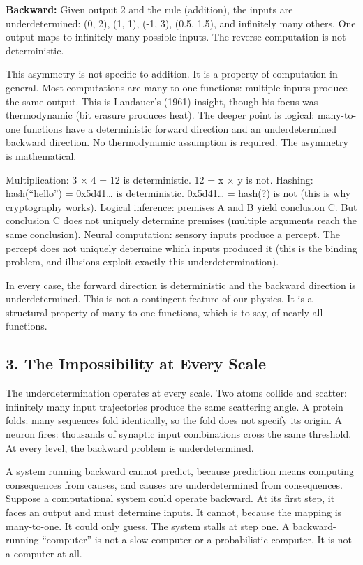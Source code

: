 \documentclass[
]{article}
\begin{document}
\textbf{Backward:} Given output 2 and the rule (addition), the inputs
are underdetermined: (0, 2), (1, 1), (-1, 3), (0.5, 1.5), and infinitely
many others. One output maps to infinitely many possible inputs. The
reverse computation is not deterministic.

This asymmetry is not specific to addition. It is a property of
computation in general. Most computations are many-to-one functions:
multiple inputs produce the same output. This is Landauer's (1961)
insight, though his focus was thermodynamic (bit erasure produces heat).
The deeper point is logical: many-to-one functions have a deterministic
forward direction and an underdetermined backward direction. No
thermodynamic assumption is required. The asymmetry is mathematical.

Multiplication: 3 × 4 = 12 is deterministic. 12 = x × y is not. Hashing:
hash(``hello'') = 0x5d41\ldots{} is deterministic. 0x5d41\ldots{} =
hash(?) is not (this is why cryptography works). Logical inference:
premises A and B yield conclusion C. But conclusion C does not uniquely
determine premises (multiple arguments reach the same conclusion).
Neural computation: sensory inputs produce a percept. The percept does
not uniquely determine which inputs produced it (this is the binding
problem, and illusions exploit exactly this underdetermination).

In every case, the forward direction is deterministic and the backward
direction is underdetermined. This is not a contingent feature of our
physics. It is a structural property of many-to-one functions, which is
to say, of nearly all functions.

\subsection{3. The Impossibility at Every
Scale}\label{the-impossibility-at-every-scale}

The underdetermination operates at every scale. Two atoms collide and
scatter: infinitely many input trajectories produce the same scattering
angle. A protein folds: many sequences fold identically, so the fold
does not specify its origin. A neuron fires: thousands of synaptic input
combinations cross the same threshold. At every level, the backward
problem is underdetermined.

A system running backward cannot predict, because prediction means
computing consequences from causes, and causes are underdetermined from
consequences. Suppose a computational system could operate backward. At
its first step, it faces an output and must determine inputs. It cannot,
because the mapping is many-to-one. It could only guess. The system
stalls at step one. A backward-running ``computer'' is not a slow
computer or a probabilistic computer. It is not a computer at all.
\end{document}
